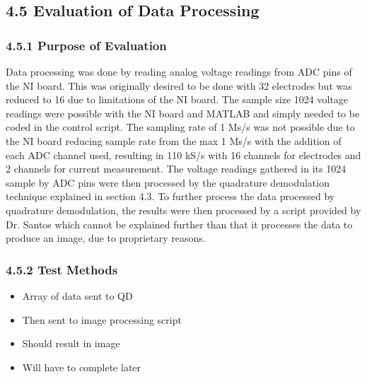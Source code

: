 \subsection*{4.5 Evaluation of Data
Processing}\label{evaluation-of-data-processing}

\subsubsection*{\texorpdfstring{\textbf{4.5.1 Purpose of
Evaluation}~}{4.5.1 Purpose of Evaluation~}}\label{purpose-of-evaluation-3}

Data processing was done by reading analog voltage readings from ADC
pins of the NI board. This was originally desired to be done with 32
electrodes but was reduced to 16 due to limitations of the NI board. The
sample size 1024 voltage readings were possible with the NI board and
MATLAB and simply needed to be coded in the control script. The sampling
rate of 1 Ms/s was not possible due to the NI board reducing sample rate
from the max 1 Ms/s with the addition of each ADC channel used,
resulting in 110 kS/s with 16 channels for electrodes and 2 channels for
current measurement. The voltage readings gathered in its 1024 sample by
ADC pins were then processed by the quadrature demodulation technique
explained in section 4.3. To further process the data processed by
quadrature demodulation, the results were then processed by a script
provided by Dr. Santos which cannot be explained further than that it
processes the data to produce an image, due to proprietary reasons.

\subsubsection*{\texorpdfstring{\textbf{4.5.2 Test} \textbf{Methods}
}{4.5.2 Test Methods }}\label{test-methods-3}

\begin{itemize}
\item
  Array of data sent to QD
\item
  Then sent to image processing script
\item
  Should result in image
\item
  Will have to complete later
\end{itemize}

